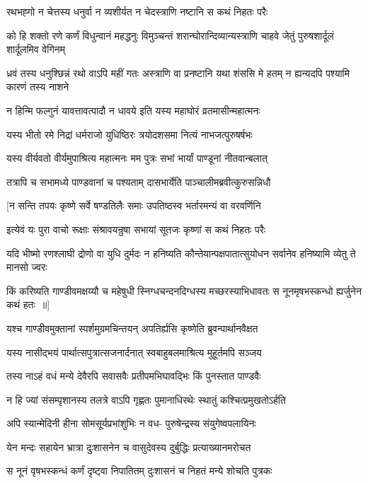 \twolineshloka
{रथभह्गो न चेत्तस्य धनुर्वा न व्यशीर्यत}
{न चेदस्त्राणि नष्टानि स कथं निहतः परैः}


\threelineshloka
{को हि शक्तो रणे कर्णं विधुन्वानं महद्धनुः}
{विमुञ्चन्तं शरान्घोरान्दिव्यान्यस्त्राणि चाहवे}
{जेतुं पुरुषशार्दूलं शार्दूलमिव वेगिनम्}


\threelineshloka
{ध्रवं तस्य धनुश्छिन्नं रथो वाऽपि महीं गतः}
{अस्त्राणि वा प्रनष्टानि यथा शंससि मे हतम्}
{न ह्यन्यदपि पश्यामि कारणं तस्य नाशने}


\twolineshloka
{न हिन्मि फल्गुनं यावत्तावत्पादौ न धावये}
{इति यस्य महाघोरं व्रतमासीन्महात्मनः}


\twolineshloka
{यस्य भीतो रमे निद्रां धर्मराजो युधिष्ठिरः}
{त्रयोदशसमा नित्यं नाभजत्पुरुषर्षभः}


\twolineshloka
{यस्य वीर्यवतो वीर्यमुपाश्रित्य महात्मनः}
{मम पुत्रः सभां भार्यां पाण्डूनां नीतवान्बलात्}


\twolineshloka
{तत्रापि च सभामध्ये पाण्डवानां च पश्यताम्}
{दासभार्येति पाञ्चालीमब्रवीत्कुरुसन्निधौ}


\twolineshloka
{[न सन्ति तपयः कृष्णे सर्वे षण्डतिलैः समाः}
{उपतिष्ठस्व भर्तारमन्यं वा वरवर्णिनि}


\twolineshloka
{इत्येवं यः पुरा वाचो रूक्षाः संश्रावयन्रुषा}
{सभायां सूतजः कृष्णां स कथं निहतः परैः}


\threelineshloka
{यदि भीष्मो रणश्लाघी द्रोणो वा युधि दुर्मदः}
{न हनिष्यति कौन्तेयान्पक्षपातात्सुयोधन}
{सर्वानेव हनिष्यामि व्येतु ते मानसो ज्वरः}


\threelineshloka
{किं करिष्यति गाण्डीवमक्षय्यौ च महेषुधी}
{स्निग्धचन्दनदिग्धस्य मच्छरस्याभिधावतः}
{स नूनमृषभस्कन्धो ह्यर्जुनेन कथं हतः ॥]}


\twolineshloka
{यश्च गाण्डीवमुक्तानां स्पर्शमुग्रमचिन्तयन्}
{अपतिर्ह्यसि कृष्णेति ब्रुवन्पार्थानवैक्षत}


\twolineshloka
{यस्य नासीद्भयं पार्थात्सपुत्रात्सजनार्दनात्}
{स्वबाहुबलमाश्रित्य मुहूर्तमपि सञ्जय}


\twolineshloka
{तस्य नाऽहं वधं मन्ये देवैरपि सवासवैः}
{प्रतीपमभिघावद्भिः किं पुनस्तात पाण्डवैः}


\twolineshloka
{न हि ज्यां संसम्पृशानस्य तलत्रे वाऽपि गृह्णतः}
{पुमानाधिरथेः स्थातुं कश्चित्प्रमुखतोऽर्हति}


\twolineshloka
{अपि स्यान्मेदिनी हीना सोमसूर्यप्रभांशुभिः}
{न वध- पुरुषेन्द्रस्य संयुगेष्वपलायिनः}


\twolineshloka
{येन मन्दः सहायेन भ्रात्रा दुःशासनेन च}
{वासुदेवस्य दुर्बुद्धिः प्रत्याख्यानमरोचत}


\twolineshloka
{स नूनं वृषभस्कन्धं कर्णं दृष्ट्वा निपातितम्}
{दुःशासनं च निहतं मन्ये शोचति पुत्रकः}


